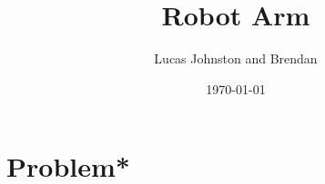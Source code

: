 \documentclass{article}
\title{Robot Arm}
\author{Lucas Johnston and Brendan }
\date{\today}
\begin{document}
    \section{Problem*}
\end{document}
